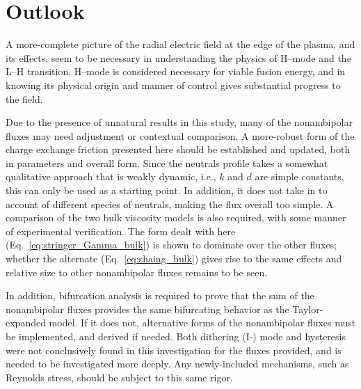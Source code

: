 \section{Outlook} \label{sec:outlook}
A more-complete picture of the radial electric field at the edge of the plasma, and its effects, seem to be necessary in understanding the physics of H--mode and the L--H transition.
H--mode is considered necessary for viable fusion energy, and in knowing its physical origin and manner of control gives substantial progress to the field.

Due to the presence of unnatural results in this study, many of the nonambipolar fluxes may need adjustment or contextual comparison.
A more-robust form of the charge exchange friction presented here should be established and updated, both in parameters and overall form.
Since the neutrals profile takes a somewhat qualitative approach that is weakly dynamic, i.e., $k$ and $d$ are simple constants, this can only be used as a starting point.
In addition, it does not take in to account of different species of neutrals, making the flux overall too simple.
A comparison of the two bulk viscosity models is also required, with some manner of experimental verification.
The form dealt with here (Eq.~\ref{eq:stringer_Gamma_bulk}) is shown to dominate over the other fluxes; whether the alternate (Eq.~\ref{eq:shaing_bulk}) gives rise to the same effects and relative size to other nonambipolar fluxes remains to be seen.

In addition, bifurcation analysis is required to prove that the sum of the nonambipolar fluxes provides the same bifurcating behavior as the Taylor-expanded model.
If it does not, alternative forms of the nonambipolar fluxes must be implemented, and derived if needed.
Both dithering (I-) mode and hysteresis were not conclusively found in this investigation for the fluxes provided, and is needed to be investigated more deeply.
Any newly-included mechanisms, such as Reynolds stress, should be subject to this same rigor.

